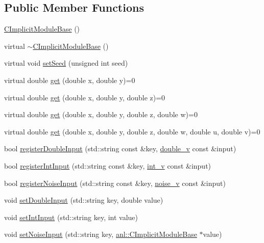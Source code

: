 \subsection*{Public Member Functions}
\begin{DoxyCompactItemize}
\item 
\hyperlink{classanl_1_1CImplicitModuleBase_a2179d89decfc65ec3f7dc2bfea98372d}{CImplicitModuleBase} ()
\item 
virtual \hyperlink{classanl_1_1CImplicitModuleBase_aa048225a76c86233b476ca598ed1cb01}{$\sim$CImplicitModuleBase} ()
\item 
virtual void \hyperlink{classanl_1_1CImplicitModuleBase_a12e7dc121de7ff95dd1952af2679867c}{setSeed} (unsigned int seed)
\item 
virtual double \hyperlink{classanl_1_1CImplicitModuleBase_ab88f8a1822dcfbc13ba5230318b0acd1}{get} (double x, double y)=0
\item 
virtual double \hyperlink{classanl_1_1CImplicitModuleBase_ac17d592612c82ba3d47f9229a00b1fe3}{get} (double x, double y, double z)=0
\item 
virtual double \hyperlink{classanl_1_1CImplicitModuleBase_a3cf520bdab59631864253c03b4e1723f}{get} (double x, double y, double z, double w)=0
\item 
virtual double \hyperlink{classanl_1_1CImplicitModuleBase_aa40b7d54572197612a4fea44b63447eb}{get} (double x, double y, double z, double w, double u, double v)=0
\item 
bool \hyperlink{classanl_1_1CImplicitModuleBase_ab86eb749d539e8282219e0f05de9c96c}{registerDoubleInput} (std::string const \&key, \hyperlink{classanl_1_1CImplicitModuleBase_a32d06aeb408b2063f45ad8c1d455e16c}{double\_\-v} const \&input)
\item 
bool \hyperlink{classanl_1_1CImplicitModuleBase_ac4143972345effb4c616e04b885d1076}{registerIntInput} (std::string const \&key, \hyperlink{classanl_1_1CImplicitModuleBase_a0af03005949051c16a5c063dd73b5eb8}{int\_\-v} const \&input)
\item 
bool \hyperlink{classanl_1_1CImplicitModuleBase_a830c5360e7cac6e4bd2c804105776dad}{registerNoiseInput} (std::string const \&key, \hyperlink{classanl_1_1CImplicitModuleBase_a29276d273677a9928320cfb6118de3ba}{noise\_\-v} const \&input)
\item 
void \hyperlink{classanl_1_1CImplicitModuleBase_a972deba664b63faa952dd5ecd381d36e}{setDoubleInput} (std::string key, double value)
\item 
void \hyperlink{classanl_1_1CImplicitModuleBase_afb474ef41f9f12afe1dd91317d8d9e9c}{setIntInput} (std::string key, int value)
\item 
void \hyperlink{classanl_1_1CImplicitModuleBase_a861c1b40199365605ec76d155ac4ea4c}{setNoiseInput} (std::string key, \hyperlink{classanl_1_1CImplicitModuleBase}{anl::CImplicitModuleBase} $\ast$value)
\end{DoxyCompactItemize}
